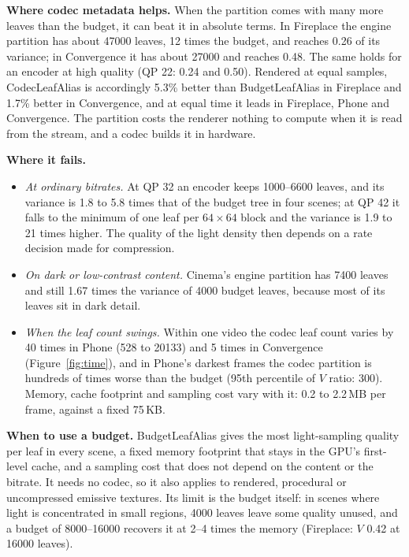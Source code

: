 \documentclass[10pt]{article}
\begin{document}
\textbf{Where codec metadata helps.} When the partition comes with many more leaves than the budget, it can beat it in absolute terms. In Fireplace the engine partition has about 47000 leaves, 12 times the budget, and reaches 0.26 of its variance; in Convergence it has about 27000 and reaches 0.48. The same holds for an encoder at high quality (QP 22: 0.24 and 0.50). Rendered at equal samples, CodecLeafAlias is accordingly 5.3\% better than BudgetLeafAlias in Fireplace and 1.7\% better in Convergence, and at equal time it leads in Fireplace, Phone and Convergence. The partition costs the renderer nothing to compute when it is read from the stream, and a codec builds it in hardware.

\textbf{Where it fails.}
\begin{itemize}\setlength{\itemsep}{0pt}
\item \emph{At ordinary bitrates.} At QP 32 an encoder keeps 1000--6600 leaves, and its variance is 1.8 to 5.8 times that of the budget tree in four scenes; at QP 42 it falls to the minimum of one leaf per $64\times64$ block and the variance is 1.9 to 21 times higher. The quality of the light density then depends on a rate decision made for compression.
\item \emph{On dark or low-contrast content.} Cinema's engine partition has 7400 leaves and still 1.67 times the variance of 4000 budget leaves, because most of its leaves sit in dark detail.
\item \emph{When the leaf count swings.} Within one video the codec leaf count varies by 40 times in Phone (528 to 20133) and 5 times in Convergence (Figure~\ref{fig:time}), and in Phone's darkest frames the codec partition is hundreds of times worse than the budget (95th percentile of $V$ ratio: 300). Memory, cache footprint and sampling cost vary with it: 0.2 to 2.2\,MB per frame, against a fixed 75\,KB.
\end{itemize}

\textbf{When to use a budget.} BudgetLeafAlias gives the most light-sampling quality per leaf in every scene, a fixed memory footprint that stays in the GPU's first-level cache, and a sampling cost that does not depend on the content or the bitrate. It needs no codec, so it also applies to rendered, procedural or uncompressed emissive textures. Its limit is the budget itself: in scenes where light is concentrated in small regions, 4000 leaves leave some quality unused, and a budget of 8000--16000 recovers it at 2--4 times the memory (Fireplace: $V$ 0.42 at 16000 leaves).
\end{document}

